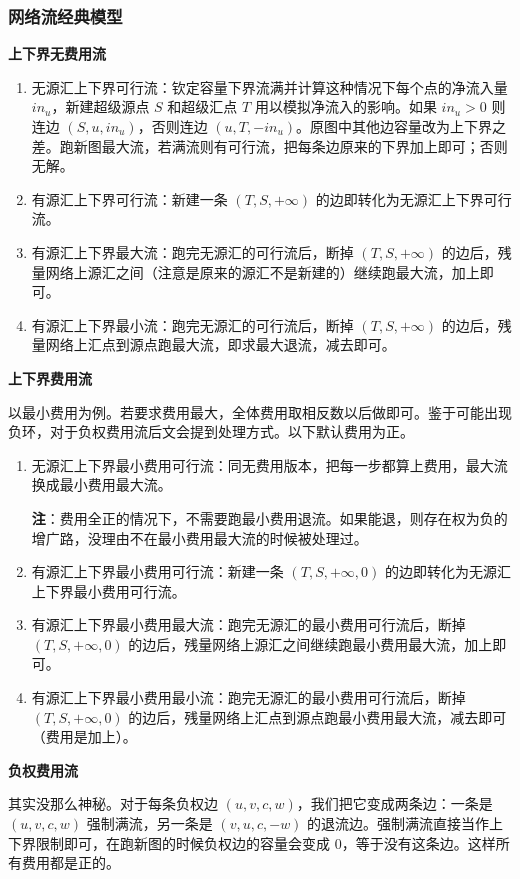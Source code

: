 \subsubsection{网络流经典模型}
\textbf{上下界无费用流}
\begin{enumerate}
	\item 无源汇上下界可行流：钦定容量下界流满并计算这种情况下每个点的净流入量 $in_u$，新建超级源点 $S$ 和超级汇点 $T$ 用以模拟净流入的影响。如果 $in_u>0$ 则连边 $(S,u,in_u)$，否则连边 $(u,T,-in_u)$。原图中其他边容量改为上下界之差。跑新图最大流，若满流则有可行流，把每条边原来的下界加上即可；否则无解。
	\item 有源汇上下界可行流：新建一条 $(T,S,+\infty)$ 的边即转化为无源汇上下界可行流。
	\item 有源汇上下界最大流：跑完无源汇的可行流后，断掉 $(T,S,+\infty)$ 的边后，残量网络上源汇之间（注意是原来的源汇不是新建的）继续跑最大流，加上即可。
	\item 有源汇上下界最小流：跑完无源汇的可行流后，断掉 $(T,S,+\infty)$ 的边后，残量网络上汇点到源点跑最大流，即求最大退流，减去即可。
\end{enumerate}
\textbf{上下界费用流}

以最小费用为例。若要求费用最大，全体费用取相反数以后做即可。鉴于可能出现负环，对于负权费用流后文会提到处理方式。以下默认费用为正。
\begin{enumerate}
	\item 无源汇上下界最小费用可行流：同无费用版本，把每一步都算上费用，最大流换成最小费用最大流。

	\textbf{注}：费用全正的情况下，不需要跑最小费用退流。如果能退，则存在权为负的增广路，没理由不在最小费用最大流的时候被处理过。
\item 有源汇上下界最小费用可行流：新建一条 $(T,S,+\infty,0)$ 的边即转化为无源汇上下界最小费用可行流。
\item 有源汇上下界最小费用最大流：跑完无源汇的最小费用可行流后，断掉 $(T,S,+\infty,0)$ 的边后，残量网络上源汇之间继续跑最小费用最大流，加上即可。
\item 有源汇上下界最小费用最小流：跑完无源汇的最小费用可行流后，断掉 $(T,S,+\infty,0)$ 的边后，残量网络上汇点到源点跑最小费用最大流，减去即可（费用是加上）。
\end{enumerate}
\textbf{负权费用流}

其实没那么神秘。对于每条负权边 $(u,v,c,w)$，我们把它变成两条边：一条是 $(u,v,c,w)$ 强制满流，另一条是 $(v,u,c,-w)$ 的退流边。强制满流直接当作上下界限制即可，在跑新图的时候负权边的容量会变成 0，等于没有这条边。这样所有费用都是正的。


